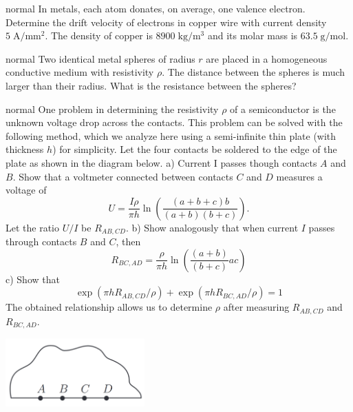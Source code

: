\hypertarget{P167}{}
\begin{solution}{normal} %
In metals, each atom donates, on average, one valence electron. Determine the drift velocity of electrons in copper wire with current density $5\;\text{A}/\text{mm}^2$. The density of copper is $8900\;\text{kg}/\text{m}^3$ and its molar mass is $63.5\;\text{g}/\text{mol}$.
\end{solution}

\hypertarget{P168}{}
\begin{solution}{normal} %
Two identical metal spheres of radius $r$ are placed in a homogeneous conductive medium with resistivity $\rho$. The distance between the spheres is much larger than their radius. What is the resistance between the spheres?
\end{solution}

\hypertarget{P169}{}
\begin{solution}{normal} %
One problem in determining the resistivity $\rho$ of a semiconductor is the unknown voltage drop across the contacts. This problem can be solved with the following method, which we analyze here using a semi-infinite thin plate (with thickness $h$) for simplicity. Let the four contacts be soldered to the edge of the plate as shown in the diagram below. a) Current I passes though contacts $A$ and $B$. Show that a voltmeter connected between contacts $C$ and $D$ measures a voltage of
$$U=\dfrac{I\rho}{\pi h}\ln\left(\dfrac{(a+b+c)b}{(a+b)(b+c)}\right).$$
Let the ratio $U/I$ be $R_{AB,CD}$. b) Show analogously that when current $I$ passes through contacts $B$ and $C$, then
$$R_{BC,AD}=\dfrac{\rho}{\pi h}\ln\left(\dfrac{(a+b)}{(b+c)}{ac}\right)$$
c) Show that
$$\exp(\pi hR_{AB,CD}/\rho)+\exp(\pi hR_{BC,AD}/\rho)=1$$
The obtained relationship allows us to determine $\rho$ after measuring $R_{AB,CD}$ and $R_{BC,AD}$.
\begin{center}
    \includegraphics[width=0.4\textwidth]{S7 Figures/S7-169.png}
\end{center}
\end{solution}

